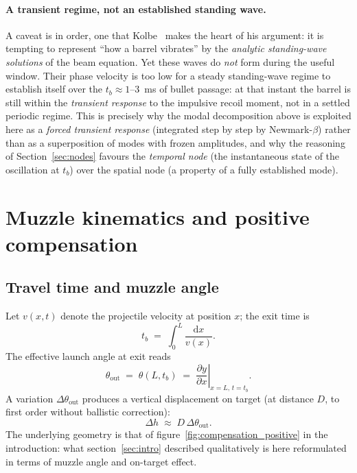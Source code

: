 \documentclass[12pt,a4paper]{article}
\begin{document}
	\paragraph{A transient regime, not an established standing wave.} A caveat is in order, one that Kolbe~\cite{KolbeSim} makes the heart of his argument: it is tempting to represent ``how a barrel vibrates'' by the \emph{analytic standing-wave solutions} of the beam equation. Yet these waves do \emph{not} form during the useful window. Their phase velocity is too low for a steady standing-wave regime to establish itself over the $t_b \approx 1$--$3$~ms of bullet passage: at that instant the barrel is still within the \emph{transient response} to the impulsive recoil moment, not in a settled periodic regime. This is precisely why the modal decomposition above is exploited here as a \emph{forced transient response} (integrated step by step by Newmark-$\beta$) rather than as a superposition of modes with frozen amplitudes, and why the reasoning of Section~\ref{sec:nodes} favours the \emph{temporal node} (the instantaneous state of the oscillation at $t_b$) over the spatial node (a property of a fully established mode).

	\section{Muzzle kinematics and positive compensation}
	\label{sec:cinematique}

	\subsection{Travel time and muzzle angle}

	Let $v(x,t)$ denote the projectile velocity at position $x$; the exit time is
	\begin{equation}
		t_b \;=\; \int_0^L \frac{\mathrm{d}x}{v(x)}.
	\end{equation}
	The effective launch angle at exit reads
	\begin{equation}
		\theta_\text{out} \;=\; \theta(L, t_b) \;=\; \left.\frac{\partial y}{\partial x}\right|_{x=L,\,t=t_b}.
	\end{equation}
	A variation $\Delta \theta_\text{out}$ produces a vertical displacement on target (at distance $D$, to first order without ballistic correction):
	\begin{equation}
		\Delta h \;\approx\; D\,\Delta \theta_\text{out}.
	\end{equation}
	The underlying geometry is that of figure~\ref{fig:compensation_positive} in the introduction: what section~\ref{sec:intro} described qualitatively is here reformulated in terms of muzzle angle and on-target effect.
\end{document}
